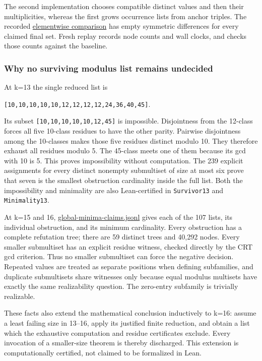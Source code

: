 \documentclass[11pt,a4paper]{article}
\begin{document}
The second implementation chooses compatible distinct values and then their multiplicities, whereas the first grows occurrence lists from anchor triples. The recorded \href{https://github.com/mpelteshki/climbing-to-the-frontier/blob/ed55f76eb8c558825bb629fd2cd8dbf46e5f1314/cagent/p4/audit/compare-independent-9-16.jsonl}{elementwise comparison} has empty symmetric differences for every claimed final set. Fresh replay records node counts and wall clocks, and checks those counts against the baseline.

\subsubsection{Why no surviving modulus list remains undecided}\label{why-no-surviving-modulus-list-remains-undecided}

At k=13 the single reduced list is

\texttt{{[}10,10,10,10,10,12,12,12,12,24,36,40,45{]}}.

Its subset \texttt{{[}10,10,10,10,10,12,45{]}} is impossible. Disjointness from the 12-class forces all five 10-class residues to have the other parity. Pairwise disjointness among the 10-classes makes those five residues distinct modulo 10. They therefore exhaust all residues modulo 5. The 45-class meets one of them because its gcd with 10 is 5. This proves impossibility without computation. The 239 explicit assignments for every distinct nonempty submultiset of size at most six prove that seven is the smallest obstruction cardinality inside the full list. Both the impossibility and minimality are also Lean-certified in \texttt{Survivor13} and \texttt{Minimality13}.

At k=15 and 16, \href{https://github.com/mpelteshki/climbing-to-the-frontier/blob/ed55f76eb8c558825bb629fd2cd8dbf46e5f1314/cagent/p4/audit/global-minima-claims.jsonl}{global-minima-claims.jsonl} gives each of the 107 lists, its individual obstruction, and its minimum cardinality. Every obstruction has a complete refutation tree; there are 59 distinct trees and 40,292 nodes. Every smaller submultiset has an explicit residue witness, checked directly by the CRT gcd criterion. Thus no smaller submultiset can force the negative decision. Repeated values are treated as separate positions when defining subfamilies, and duplicate submultisets share witnesses only because equal modulus multisets have exactly the same realizability question. The zero-entry subfamily is trivially realizable.

These facts also extend the mathematical conclusion inductively to k=16: assume a least failing size in 13--16, apply its justified finite reduction, and obtain a list which the exhaustive computation and residue certificates exclude. Every invocation of a smaller-size theorem is thereby discharged. This extension is computationally certified, not claimed to be formalized in Lean.
\end{document}
